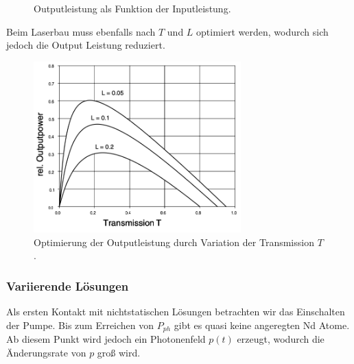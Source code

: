 \documentclass{subfiles}
\begin{document}
\begin{Antwort}
\begin{figure}
            \caption{Outputleistung als Funktion der Inputleistung.}
            \label{fig:Pumpleistung}
        \end{figure}
        Beim Laserbau muss ebenfalls nach $T$ und $L$ optimiert werden, wodurch sich jedoch die Output Leistung reduziert. 
        \begin{figure}[H]
            \centering
            \includegraphics[width=8cm]{Bilddateien/TOptimierung.png}
            \caption{Optimierung der Outputleistung durch Variation der Transmission $T$.}
        \end{figure} 

        \subsubsection*{Variierende Lösungen}
            Als ersten Kontakt mit nichtstatischen Lösungen betrachten wir das Einschalten der Pumpe. Bis zum Erreichen von $P_{ph}$ gibt es quasi keine angeregten Nd Atome. Ab diesem Punkt wird jedoch ein Photonenfeld $p(t)$ erzeugt, wodurch die Änderungsrate von $p$ groß wird. 

    \end{Antwort}
\end{document}
